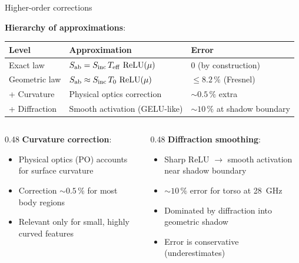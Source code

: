 \begin{frame}[label=app-p1-corrections]{Higher-order corrections}

  \textbf{Hierarchy of approximations}:

  \vspace{4pt}
  {\small
  \begin{tabular}{lll}
    \toprule
    Level & Approximation & Error \\
    \midrule
    Exact law & $S_{\mathrm{ab}} = S_{\mathrm{inc}}\,T_{\mathrm{eff}}\,\operatorname{ReLU}(\mu)$ & 0 (by construction) \\
    Geometric law & $S_{\mathrm{ab}} \approx S_{\mathrm{inc}}\, T_0\, \operatorname{ReLU}(\mu)$ & $\le 8.2\,\%$ (Fresnel) \\
    + Curvature & Physical optics correction & ${\sim}0.5\,\%$ extra \\
    + Diffraction & Smooth activation (GELU-like) & ${\sim}10\,\%$ at shadow boundary \\
    \bottomrule
  \end{tabular}
  }

  \vspace{4pt}
  \begin{columns}[T]
    \begin{column}{0.48\textwidth}
      \textbf{Curvature correction}:
      \begin{itemize}
        \item Physical optics (PO) accounts for surface curvature
        \item Correction ${\sim}0.5\,\%$ for most body regions
        \item Relevant only for small, highly curved features
      \end{itemize}
    \end{column}

    \begin{column}{0.48\textwidth}
      \textbf{Diffraction smoothing}:
      \begin{itemize}
        \item Sharp ReLU $\to$ smooth activation near shadow boundary
        \item ${\sim}10\,\%$ error for torso at \SI{28}{\giga\hertz}
        \item Dominated by diffraction into geometric shadow
        \item Error is conservative (underestimates)
      \end{itemize}
    \end{column}
  \end{columns}

  \vspace{4pt}
\end{frame}

